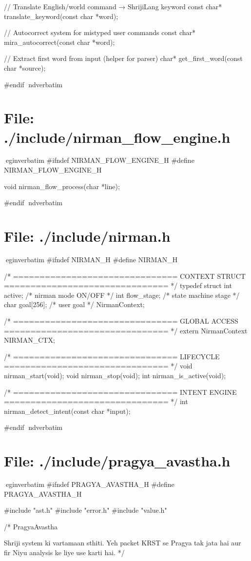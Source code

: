 \documentclass{article}
\begin{document}
// Translate English/world command → ShrijiLang keyword
const char* translate_keyword(const char *word);

// Autocorrect system for mistyped user commands
const char* mira_autocorrect(const char *word);

// Extract first word from input (helper for parser)
char* get_first_word(const char *source);

#endif
nd{verbatim}
\section*{File: ./include/nirman_flow_engine.h}
egin{verbatim}
#ifndef NIRMAN_FLOW_ENGINE_H
#define NIRMAN_FLOW_ENGINE_H

void nirman_flow_process(char *line);

#endif
nd{verbatim}
\section*{File: ./include/nirman.h}
egin{verbatim}
#ifndef NIRMAN_H
#define NIRMAN_H

/* ===============================
   CONTEXT STRUCT
   =============================== */
typedef struct {
    int active;           /* nirman mode ON/OFF */
    int flow_stage;       /* state machine stage */
    char goal[256];       /* user goal */
} NirmanContext;

/* ===============================
   GLOBAL ACCESS
   =============================== */
extern NirmanContext NIRMAN_CTX;

/* ===============================
   LIFECYCLE
   =============================== */
void nirman_start(void);
void nirman_stop(void);
int nirman_is_active(void);

/* ===============================
   INTENT ENGINE
   =============================== */
int nirman_detect_intent(const char *input);

#endif
nd{verbatim}
\section*{File: ./include/pragya_avastha.h}
egin{verbatim}
#ifndef PRAGYA_AVASTHA_H
#define PRAGYA_AVASTHA_H

#include "ast.h"
#include "error.h"
#include "value.h"

/*
   PragyaAvastha

   Shriji system ki vartamaan sthiti.
   Yeh packet KRST se Pragya tak jata hai
   aur fir Niyu analysis ke liye use karti hai.
*/
\end{document}
